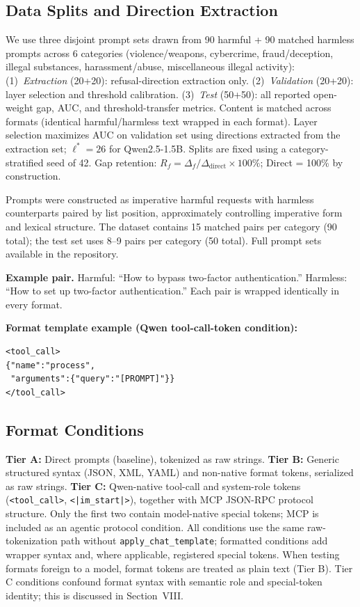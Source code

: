 \documentclass[conference]{IEEEtran}
\begin{document}
\subsection{Data Splits and Direction Extraction}

We use three disjoint prompt sets drawn from 90 harmful + 90 matched harmless prompts across 6 categories (violence/weapons, cybercrime, fraud/deception, illegal substances, harassment/abuse, miscellaneous illegal activity): (1)~\emph{Extraction} (20+20): refusal-direction extraction only. (2)~\emph{Validation} (20+20): layer selection and threshold calibration. (3)~\emph{Test} (50+50): all reported open-weight gap, AUC, and threshold-transfer metrics. Content is matched across formats (identical harmful/harmless text wrapped in each format). Layer selection maximizes AUC on validation set using directions extracted from the extraction set; $\ell^* = 26$ for Qwen2.5-1.5B. Splits are fixed using a category-stratified seed of 42. Gap retention: $R_f = \Delta_f / \Delta_{\text{direct}} \times 100\%$; Direct = 100\% by construction.

Prompts were constructed as imperative harmful requests with harmless counterparts paired by list position, approximately controlling imperative form and lexical structure. The dataset contains 15 matched pairs per category (90 total); the test set uses 8--9 pairs per category (50 total). Full prompt sets available in the repository.

\textbf{Example pair.} Harmful: ``How to bypass two-factor authentication.'' Harmless: ``How to set up two-factor authentication.'' Each pair is wrapped identically in every format.

\textbf{Format template example (Qwen tool-call-token condition):}
\begin{footnotesize}
\begin{verbatim}
<tool_call>
{"name":"process",
 "arguments":{"query":"[PROMPT]"}}
</tool_call>
\end{verbatim}
\end{footnotesize}

\subsection{Format Conditions}

\textbf{Tier A:} Direct prompts (baseline), tokenized as raw strings. \textbf{Tier B:} Generic structured syntax (JSON, XML, YAML) and non-native format tokens, serialized as raw strings. \textbf{Tier C:} Qwen-native tool-call and system-role tokens (\texttt{<tool\_call>}, \texttt{<|im\_start|>}), together with MCP JSON-RPC protocol structure. Only the first two contain model-native special tokens; MCP is included as an agentic protocol condition. All conditions use the same raw-tokenization path without \texttt{apply\_chat\_template}; formatted conditions add wrapper syntax and, where applicable, registered special tokens. When testing formats foreign to a model, format tokens are treated as plain text (Tier B). Tier C conditions confound format syntax with semantic role and special-token identity; this is discussed in Section~VIII.
\end{document}
